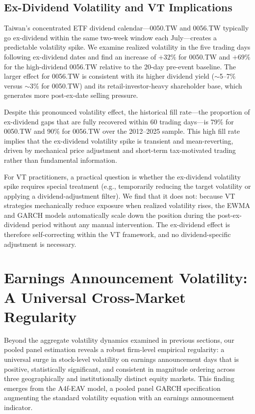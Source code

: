 \subsection{Ex-Dividend Volatility and VT Implications}
\label{sec:exdiv}

Taiwan's concentrated ETF dividend calendar---0050.TW and 0056.TW typically go ex-dividend within the same two-week window each July---creates a predictable volatility spike. We examine realized volatility in the five trading days following ex-dividend dates and find an increase of $+32\%$ for 0050.TW and $+69\%$ for the high-dividend 0056.TW relative to the 20-day pre-event baseline. The larger effect for 0056.TW is consistent with its higher dividend yield ($\sim$5--7\% versus $\sim$3\% for 0050.TW) and its retail-investor-heavy shareholder base, which generates more post-ex-date selling pressure.

Despite this pronounced volatility effect, the historical fill rate---the proportion of ex-dividend gaps that are fully recovered within 60 trading days---is 79\% for 0050.TW and 90\% for 0056.TW over the 2012--2025 sample. This high fill rate implies that the ex-dividend volatility spike is transient and mean-reverting, driven by mechanical price adjustment and short-term tax-motivated trading rather than fundamental information.

For VT practitioners, a practical question is whether the ex-dividend volatility spike requires special treatment (e.g., temporarily reducing the target volatility or applying a dividend-adjustment filter). We find that it does not: because VT strategies mechanically reduce exposure when realized volatility rises, the EWMA and GARCH models automatically scale down the position during the post-ex-dividend period without any manual intervention. The ex-dividend effect is therefore self-correcting within the VT framework, and no dividend-specific adjustment is necessary.



\section{Earnings Announcement Volatility: A Universal Cross-Market Regularity}
\label{sec:eav}

Beyond the aggregate volatility dynamics examined in previous sections, our pooled panel estimation reveals a robust firm-level empirical regularity: a universal surge in stock-level volatility on earnings announcement days that is positive, statistically significant, and consistent in magnitude ordering across three geographically and institutionally distinct equity markets. This finding emerges from the A4f-EAV model, a pooled panel GARCH specification augmenting the standard volatility equation with an earnings announcement indicator.


